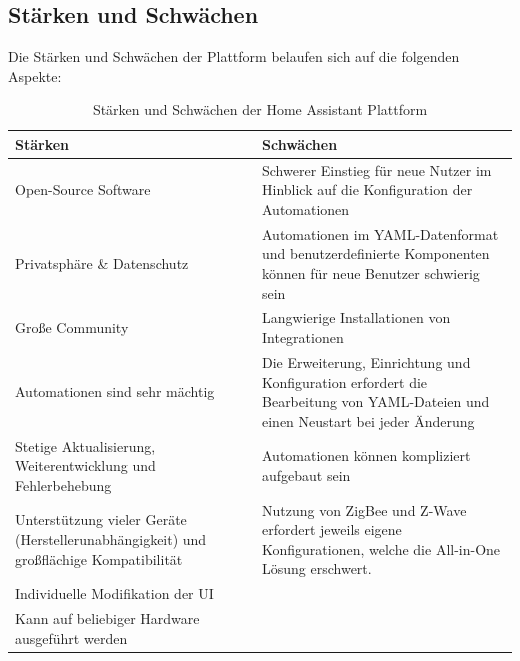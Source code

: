 
\subsection{Stärken und Schwächen}
    Die Stärken und Schwächen der Plattform belaufen sich auf die folgenden Aspekte:
    \begin{table}[hbt!]
        \begin{center}
            \begin{tabular}{| p{7.875cm} | p{7.875cm} | }
                \hline
                    \textbf{Stärken} & \textbf{Schwächen} \\
                \hline
                    Open-Source Software & Schwerer Einstieg für neue Nutzer im Hinblick auf die Konfiguration der Automationen \\ 
                \hline
                    Privatsphäre \& Datenschutz & Automationen im YAML-Datenformat und benutzerdefinierte Komponenten können für neue Benutzer schwierig sein \\ 
                \hline
                    Große Community & Langwierige Installationen von Integrationen \\ 
                \hline
                    Automationen sind sehr mächtig & Die Erweiterung, Einrichtung und Konfiguration erfordert die Bearbeitung von YAML-Dateien und einen Neustart bei jeder Änderung \\ 
                \hline
                    Stetige Aktualisierung, Weiterentwicklung und Fehlerbehebung & Automationen können kompliziert aufgebaut sein \\ %
                \hline 
                    Unterstützung vieler Geräte (Herstellerunabhängigkeit) und großflächige Kompatibilität & Nutzung von ZigBee und Z-Wave erfordert jeweils eigene Konfigurationen, welche die All-in-One Lösung erschwert. \\
                \hline
                    Individuelle Modifikation der UI &  \\ 
                \hline
                    Kann auf beliebiger Hardware ausgeführt werden &  \\
                \hline
            \end{tabular}
        \end{center}
        \caption{Stärken und Schwächen der Home Assistant Plattform}
        \label{tab:prosConsHAOS}
    \end{table}
